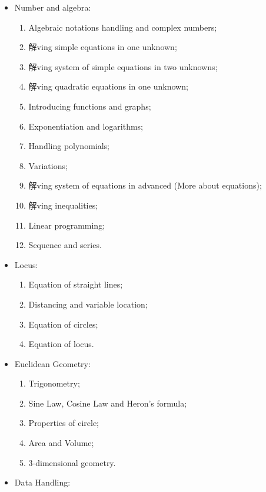 \documentclass{article}
\begin{document}
    \begin{itemize}
        \item Number and algebra:\begin{enumerate}
            \item Algebraic notations handling and complex numbers;
            \item 解ving simple equations in one unknown;
            \item 解ving system of simple equations in two unknowns;
            \item 解ving quadratic equations in one unknown;
            \item Introducing functions and graphs;
            \item Exponentiation and logarithms;
            \item Handling polynomials;
            \item Variations;
            \item 解ving system of equations in advanced (More about equations);
            \item 解ving inequalities;
            \item Linear programming;
            \item Sequence and series.
        \end{enumerate}
        \item Locus:\begin{enumerate}
            \item Equation of straight lines;
            \item Distancing and variable location;
            \item Equation of circles;
            \item Equation of locus.
        \end{enumerate}
        \item Euclidean Geometry:\begin{enumerate}
            \item Trigonometry;
            \item Sine Law, Cosine Law and Heron's formula;
            \item Properties of circle;
            \item Area and Volume;
            \item 3-dimensional geometry.
        \end{enumerate}
        \item Data Handling:\begin{enumerate}

\end{enumerate}
\end{itemize}
\end{document}
